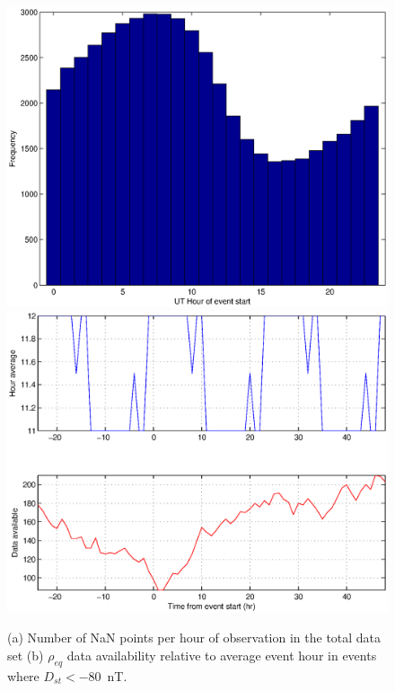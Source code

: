 \documentclass[10pt,twocolumn]{article}
\begin{document}
\begin{figure}[tp]
\centering
\includegraphics[scale=0.5]{paperfigures/nansbyhour.eps}
\includegraphics[scale=0.5]{paperfigures/nansbyhour_storm.eps}
\caption{(a) Number of NaN points per hour of observation in the total data set (b) $\rho_{eq}$ data availability relative to average event hour in events where $D_{st}<-80$~nT.}
\label{nanperhour}
\end{figure}
\clearpage
\end{document}
